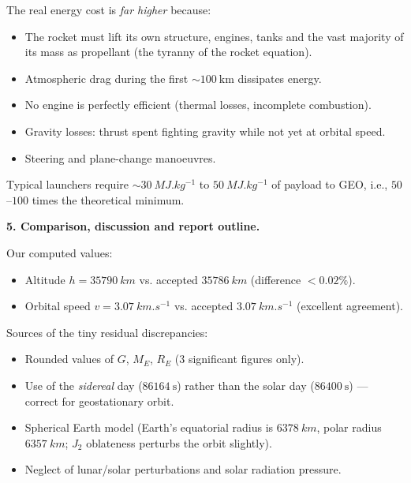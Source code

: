 \documentclass[11pt]{article}
\newcommand{\cle}[1]{{\popxbold\color{popdark}#1}}
\begin{document}
\begin{exoresolu}
\begin{attention}
The real energy cost is \emph{far higher} because:
\begin{itemize}
\item The rocket must lift its own structure, engines, tanks and the vast majority of its mass as propellant (the \cle{tyranny of the rocket equation}).
\item Atmospheric drag during the first $\sim 100\ \mathrm{km}$ dissipates energy.
\item No engine is perfectly efficient (thermal losses, incomplete combustion).
\item Gravity losses: thrust spent fighting gravity while not yet at orbital speed.
\item Steering and plane-change manoeuvres.
\end{itemize}
Typical launchers require $\sim \SI{30}{MJ.kg^{-1}}$ to $\SI{50}{MJ.kg^{-1}}$ of payload to GEO, i.e., $50$--$100$ times the theoretical minimum.
\end{attention}

\textbf{5. Comparison, discussion and report outline.}\par
Our computed values:
\begin{itemize}
\item Altitude $h = \SI{35790}{km}$ vs. accepted $\SI{35786}{km}$ (difference $< 0.02\%$).
\item Orbital speed $v = \SI{3.07}{km.s^{-1}}$ vs. accepted $\SI{3.07}{km.s^{-1}}$ (excellent agreement).
\end{itemize}
Sources of the tiny residual discrepancies:
\begin{itemize}
\item Rounded values of $G$, $M_E$, $R_E$ (3 significant figures only).
\item Use of the \emph{sidereal} day ($86164\ \mathrm{s}$) rather than the solar day ($86400\ \mathrm{s}$) — correct for geostationary orbit.
\item Spherical Earth model (Earth's equatorial radius is $\SI{6378}{km}$, polar radius $\SI{6357}{km}$; $J_2$ oblateness perturbs the orbit slightly).
\item Neglect of lunar/solar perturbations and solar radiation pressure.
\end{itemize}


\end{exoresolu}
\end{document}
